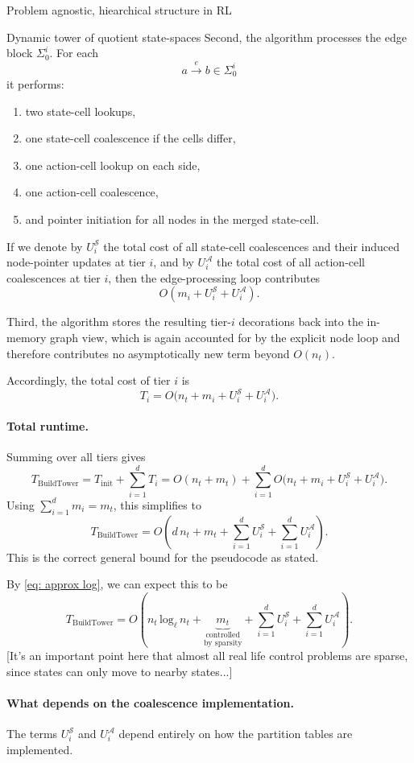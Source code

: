 \documentclass[11pt]{article}
\begin{document}
\begin{section}{Problem agnostic, hiearchical structure in RL}
\begin{subsection}{Dynamic tower of quotient state-spaces}
Second, the algorithm processes the edge block $\Sigma_0^i$. For each
\[
a\xrightarrow{\ e\ }b\in\Sigma_0^i
\]
it performs:
\begin{enumerate}
    \item two state-cell lookups,
    \item one state-cell coalescence if the cells differ,
    \item one action-cell lookup on each side,
    \item one action-cell coalescence,
    \item and pointer initiation for all nodes in the merged state-cell.
\end{enumerate}
If we denote by
$
U_i^{\mathcal S}
$
the total cost of all state-cell coalescences and their induced node-pointer updates at tier $i$, and by
$
U_i^{\mathcal A}
$
the total cost of all action-cell coalescences at tier $i$, then the edge-processing loop contributes
\[
O(m_i + U_i^{\mathcal S}+U_i^{\mathcal A}).
\]

Third, the algorithm stores the resulting tier-$i$ decorations back into the in-memory graph view, which is again accounted for by the explicit node loop and therefore contributes no asymptotically new term beyond $O(n_t)$.

Accordingly, the total cost of tier $i$ is
\[
T_i = O\bigl(n_t + m_i + U_i^{\mathcal S}+U_i^{\mathcal A}\bigr).
\]

\paragraph{Total runtime.}
Summing over all tiers gives
\[
T_{\mathrm{BuildTower}}
=
T_{\mathrm{init}} + \sum_{i=1}^d T_i
=
O(n_t+m_t)
+
\sum_{i=1}^d O\bigl(n_t + m_i + U_i^{\mathcal S}+U_i^{\mathcal A}\bigr).
\]
Using $\sum_{i=1}^d m_i=m_t$, this simplifies to
\[
T_{\mathrm{BuildTower}}
=
O\!\left(
d\,n_t + m_t + \sum_{i=1}^d U_i^{\mathcal S} + \sum_{i=1}^d U_i^{\mathcal A}
\right).
\]
This is the correct general bound for the pseudocode as stated.

By \eqref{eq: approx log}, we can expect this to be
\[
T_{\mathrm{BuildTower}}
=
O\!\left(
n_t\,\text{log}_{\ell}\,n_{t} + 
\!\!\!\!\!
\underset{\text{by sparsity}}{\underset{\text{controlled}}{\underbrace{m_t}}}
 + \sum_{i=1}^d U_i^{\mathcal S} + \sum_{i=1}^d U_i^{\mathcal A}
\right).
\]
[It's an important point here that almost all real life control problems are sparse, since states can only move to nearby states...]

\paragraph{What depends on the coalescence implementation.}
The terms $
U_i^{\mathcal S}$ and 
$U_i^{\mathcal A}$ depend entirely on how the partition tables are implemented.


\end{subsection}
\end{section}
\end{document}
